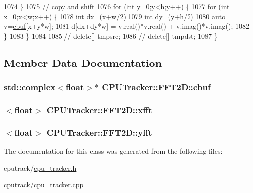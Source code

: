 \begin{DoxyCode}
1074     \}
1075     \textcolor{comment}{// copy and shift}
1076     \textcolor{keywordflow}{for} (\textcolor{keywordtype}{int} y=0;y<h;y++) \{
1077         \textcolor{keywordflow}{for} (\textcolor{keywordtype}{int} x=0;x<w;x++) \{
1078             \textcolor{keywordtype}{int} dx=(x+w/2)%
1079             \textcolor{keywordtype}{int} dy=(y+h/2)%
1080             \textcolor{keyword}{auto} v=\hyperlink{class_c_p_u_tracker_1_1_f_f_t2_d_a1d2a1206265cc858a91446f9dd081b6c}{cbuf}[x+y*w];
1081             d[dx+dy*w] = v.real()*v.real() + v.imag()*v.imag();
1082         \}
1083     \}
1084 
1085 \textcolor{comment}{//  delete[] tmpsrc;}
1086 \textcolor{comment}{//  delete[] tmpdst;}
1087 \}
\end{DoxyCode}


\subsection{Member Data Documentation}
\subsubsection[{\texorpdfstring{cbuf}{cbuf}}]{\setlength{\rightskip}{0pt plus 5cm}std\+::complex$<$float$>$$\ast$ C\+P\+U\+Tracker\+::\+F\+F\+T2\+D\+::cbuf}\hypertarget{class_c_p_u_tracker_1_1_f_f_t2_d_a1d2a1206265cc858a91446f9dd081b6c}{}\label{class_c_p_u_tracker_1_1_f_f_t2_d_a1d2a1206265cc858a91446f9dd081b6c}
\subsubsection[{\texorpdfstring{xfft}{xfft}}]{$<$float$>$ C\+P\+U\+Tracker\+::\+F\+F\+T2\+D\+::xfft}\hypertarget{class_c_p_u_tracker_1_1_f_f_t2_d_aaf92fefc5608fec68b29fb85ca688e58}{}\label{class_c_p_u_tracker_1_1_f_f_t2_d_aaf92fefc5608fec68b29fb85ca688e58}
\subsubsection[{\texorpdfstring{yfft}{yfft}}]{$<$float$>$ C\+P\+U\+Tracker\+::\+F\+F\+T2\+D\+::yfft}\hypertarget{class_c_p_u_tracker_1_1_f_f_t2_d_ada8cd484cb495ade7c790a39bb141651}{}\label{class_c_p_u_tracker_1_1_f_f_t2_d_ada8cd484cb495ade7c790a39bb141651}


The documentation for this class was generated from the following files\+:\begin{DoxyCompactItemize}
\item 
cputrack/\hyperlink{cpu__tracker_8h}{cpu\+\_\+tracker.\+h}\item 
cputrack/\hyperlink{cpu__tracker_8cpp}{cpu\+\_\+tracker.\+cpp}\end{DoxyCompactItemize}
